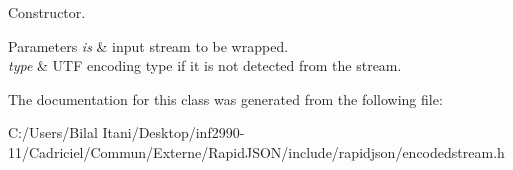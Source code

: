 Constructor. 


\begin{DoxyParams}{Parameters}
{\em is} & input stream to be wrapped. \\
\hline
{\em type} & U\+TF encoding type if it is not detected from the stream. \\
\hline
\end{DoxyParams}


The documentation for this class was generated from the following file\+:\begin{DoxyCompactItemize}
\item 
C\+:/\+Users/\+Bilal Itani/\+Desktop/inf2990-\/11/\+Cadriciel/\+Commun/\+Externe/\+Rapid\+J\+S\+O\+N/include/rapidjson/encodedstream.\+h\end{DoxyCompactItemize}
